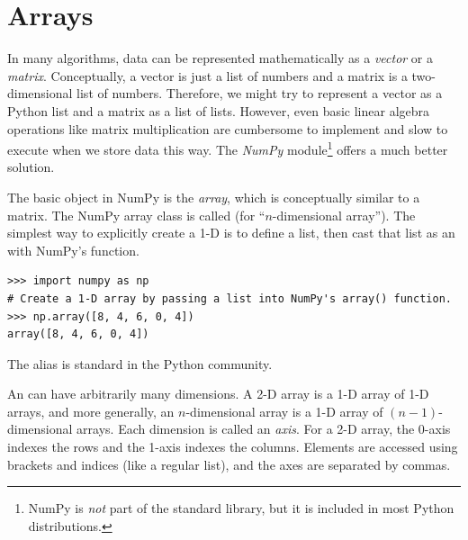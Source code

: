 \label{lab:NumPy}


\section*{Arrays} %

In many algorithms, data can be represented mathematically as a \emph{vector} or a \emph{matrix}.
Conceptually, a vector is just a list of numbers and a matrix is a two-dimensional list of numbers.
Therefore, we might try to represent a vector as a Python list and a matrix as a list of lists.
However, even basic linear algebra operations like matrix multiplication are cumbersome to implement and slow to execute when we store data this way.
The \emph{NumPy} module\footnote{NumPy is \emph{not} part of the standard library, but it is included in most Python distributions.} offers a much better solution.

The basic object in NumPy is the \emph{array}, which is conceptually similar to a matrix.
The NumPy array class is called  (for ``$n$-dimensional array'').
The simplest way to explicitly create a 1-D  is to define a list, then cast that list as an  with NumPy's  function.

\begin{lstlisting}
>>> import numpy as np
# Create a 1-D array by passing a list into NumPy's array() function.
>>> np.array([8, 4, 6, 0, 4])
array([8, 4, 6, 0, 4])
\end{lstlisting}
The alias  is standard in the Python community. %

An  can have arbitrarily many dimensions.
A 2-D array is a 1-D array of 1-D arrays, and more generally, an $n$-dimensional array is a 1-D array of $(n-1)$-dimensional arrays.
Each dimension is called an \emph{axis}.
For a 2-D array, the 0-axis indexes the rows and the 1-axis indexes the columns.
Elements are accessed using brackets and indices (like a regular list), and the axes are separated by commas.

